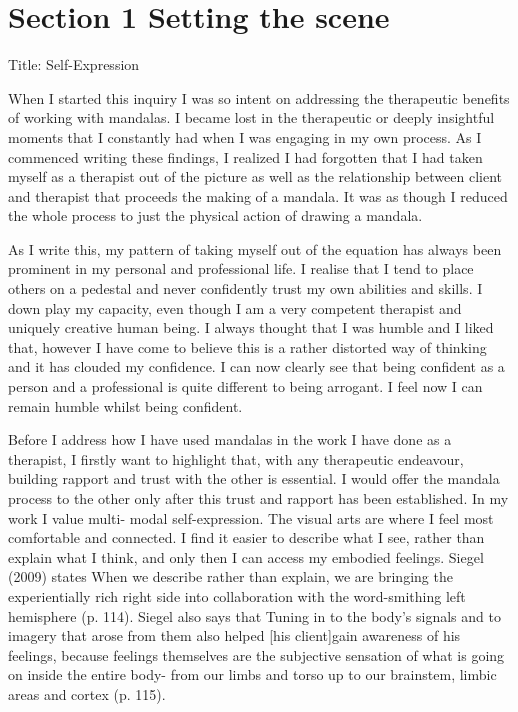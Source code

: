 \chapter{Section 1 
Setting the scene}


Title: Self-Expression

When I started this inquiry I was so intent on addressing the therapeutic benefits of working with mandalas. I became lost in the therapeutic or deeply insightful moments that I constantly had when I was engaging in my own process. As I commenced writing these findings, I realized I had forgotten that I had taken myself as a therapist out of the picture as well as the relationship between client and therapist that proceeds the making of a mandala. It was as though I reduced the whole process to just the physical action of drawing a mandala. 

As I write this, my pattern of taking myself out of the equation has always been prominent in my personal and professional life. I realise that I tend to place others on a pedestal and never confidently trust my own abilities and skills. I down play my capacity, even though I am a very competent therapist and uniquely creative human being. I always thought that I was humble and I liked that, however I have come to believe this is a rather distorted way of thinking and it has clouded my confidence. I can now clearly see that being confident as a person and a professional is quite different to being arrogant. I feel now I can remain humble whilst being confident.

Before I address how I have used mandalas in the work I have done as a therapist, I firstly want to highlight that, with any therapeutic endeavour, building rapport and trust with the other is essential. I would offer the mandala process to the other only after this trust and rapport has been established. In my work I value multi- modal self-expression. The visual arts are where I feel most comfortable and connected. I find it easier to describe what I see, rather than explain what I think, and only then I can access my embodied feelings. Siegel (2009) states When we describe rather than explain, we are bringing the experientially rich right side into collaboration with the word-smithing left hemisphere (p. 114). Siegel also says that Tuning in to the body's signals and to imagery that arose from them also helped [his client]gain awareness of his feelings, because feelings themselves are the subjective sensation of what is going on inside the entire body- from our limbs and torso up to our brainstem, limbic areas and cortex (p. 115).

